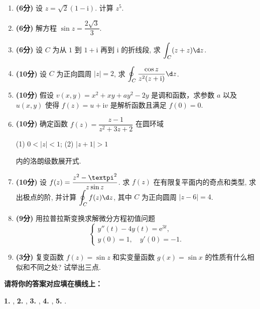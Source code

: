 \documentclass[simple]{hfutexam}
\let\Im\relax\DeclareMathOperator{\Im}{Im}
\let\Re\relax\DeclareMathOperator{\Re}{Re}
\newcommand{\ii}{\mathrm{i}}
\newcommand{\ee}{\mathrm{e}}
\newcommand{\cpi}{{\text{\textpi}}}
\newcommand{\dirac}{{\text{\textdelta}}}
\newcommand{\dint}{\displaystyle\int}
\newcommand{\doint}{\displaystyle\oint}
\begin{document}
\begin{enumerate}
  \item \textbf{(6分)} 设 $z=\sqrt2(1-\ii)$. 计算 $z^5$.
  \item \textbf{(6分)} 解方程 $\sin z=\dfrac{2\sqrt3}3$.
  \item \textbf{(6分)} 设 $C$ 为从 $1$ 到 $1+\ii$ 再到 $\ii$ 的折线段, 求 $\dint_C (\Re z+\Im z) \d z$.
  \item \textbf{(10分)} 设 $C$ 为正向圆周 $|z|=2$, 求 $\doint_C\frac{\cos z}{z^2(z+\ii)}\d z$.
  \item \textbf{(10分)} 假设 $v(x,y)=x^2+xy+ay^2-2y$ 是调和函数，求参数 $a$ 以及 $u(x,y)$ 使得 $f(z)=u+\ii v$ 是解析函数且满足 $f(0)=0$.
  \item \textbf{(10分)} 确定函数 $f(z)=\dfrac{z-1}{z^2+3z+2}$ 在圆环域\par
(1) $0<|z|<1$; \hspace{2em} (2) $|z+1|>1$\par
内的洛朗级数展开式.
  \item \textbf{(10分)} 设 $f(z)=\dfrac{z^2-\cpi^2}{z\sin z}$. 求 $f(z)$ 在有限复平面内的奇点和类型, 求出极点的阶, 并计算 $\doint_{C}f(z)\d z$, 其中 $C$ 为正向圆周 $|z-6|=4$.
  \item \textbf{(9分)} 用拉普拉斯变换求解微分方程初值问题
\[\begin{cases}
y''(t)-4y(t)=\ee^{3t},\\
y(0)=1,\quad y'(0)=-1.
\end{cases}\]
  \item \textbf{(3分)} 复变函数 $f(z)=\sin z$ 和实变量函数 $g(x)=\sin x$ 的性质有什么相似和不同之处? 试举出三点.
\end{enumerate}


\newpage
{}
\ZhuanYeBanJi{}
\maketitle


\textbf{请将你的答案对应填在横线上：}

\textbf{1.} , 
\textbf{2.} \fillblank[2.5cm]{$-\frac{\cpi\ii}2$}, 
\textbf{3.} \fillblank[1.7cm]{$2\cpi\ii$}, 
\textbf{4.} , 
\textbf{5.} \fillblank[4.5cm]{$-4\cpi\dirac(\omega)$}.
\end{document}

